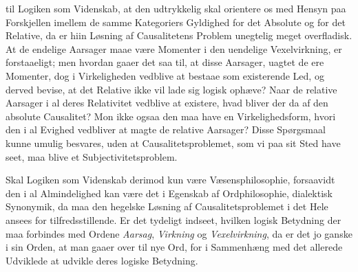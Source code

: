 \documentclass[12pt]{book}
\newcommand{\opage}[1]{\marginnote{\footnotesize\textit{[#1]}}}
\begin{document}
til Logiken som Videnskab, at den udtrykkelig skal orientere os med Hensyn paa Forskjellen
imellem de samme Kategoriers Gyldighed for det Absolute og for det Relative, da er hiin
Løsning af Causalitetens Problem unegtelig meget overfladisk. At de
\opage{139} endelige Aarsager maae være Momenter i den uendelige Vexelvirkning, er forstaaeligt; men
hvordan gaaer det saa til, at disse Aarsager, uagtet de ere Momenter, dog i Virkeligheden
vedblive at bestaae som existerende Led, og derved bevise, at det Relative ikke vil lade
sig logisk ophæve? Naar de relative Aarsager i al deres Relativitet vedblive at existere,
hvad bliver der da af den absolute Causalitet? Mon ikke ogsaa den maa have en
Virkelighedsform, hvori den i al Evighed vedbliver at magte de relative Aarsager? Disse
Spørgsmaal kunne umulig besvares, uden at Causalitetsproblemet, som vi paa sit Sted have
seet, maa blive et Subjectivitetsproblem.

Skal Logiken som Videnskab derimod kun være Væsensphilosophie, forsaavidt den i al
Almindelighed kan være det i Egenskab af Ordphilosophie, dialektisk Synonymik, da maa den
hegelske Løsning af Causalitetsproblemet i det Hele ansees for tilfredsstillende. Er det
tydeligt indseet, hvilken logisk Betydning der maa forbindes med Ordene \emph{Aarsag},
\emph{Virkning} og \emph{Vexelvirkning}, da er det jo ganske i sin Orden, at man gaaer
over til nye Ord, for i Sammenhæng med det allerede Udviklede at udvikle deres logiske
Betydning.
\end{document}
